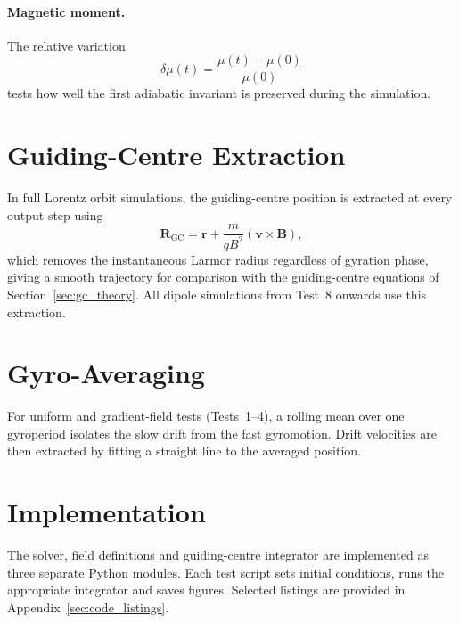 \paragraph{Magnetic moment.} The relative variation
\begin{equation}
  \delta\mu(t) = \frac{\mu(t) - \mu(0)}{\mu(0)}
  \label{eq:mu_diag}
\end{equation}
tests how well the first adiabatic invariant is preserved during the simulation.

\section{Guiding-Centre Extraction}
\label{sec:gc_extract}

In full Lorentz orbit simulations, the guiding-centre position is extracted at every output step using
\begin{equation}
  \mathbf{R}_\mathrm{GC} = \mathbf{r} + \frac{m}{qB^2}
    \left(\mathbf{v} \times \mathbf{B}\right),
  \label{eq:gc_extract}
\end{equation}
which removes the instantaneous Larmor radius regardless of gyration phase, giving a smooth trajectory for comparison with the guiding-centre equations of Section~\ref{sec:gc_theory}. All dipole simulations from Test~8 onwards use this extraction.

\section{Gyro-Averaging}
\label{sec:gyroavg}

For uniform and gradient-field tests (Tests~1--4), a rolling mean over one gyroperiod isolates the slow drift from the fast gyromotion. Drift velocities are then extracted by fitting a straight line to the averaged position.

\section{Implementation}
\label{sec:implementation}

The solver, field definitions and guiding-centre integrator are
implemented as three separate Python modules. Each test script sets initial conditions, runs the appropriate integrator and saves figures. Selected listings are provided in Appendix~\ref{sec:code_listings}.